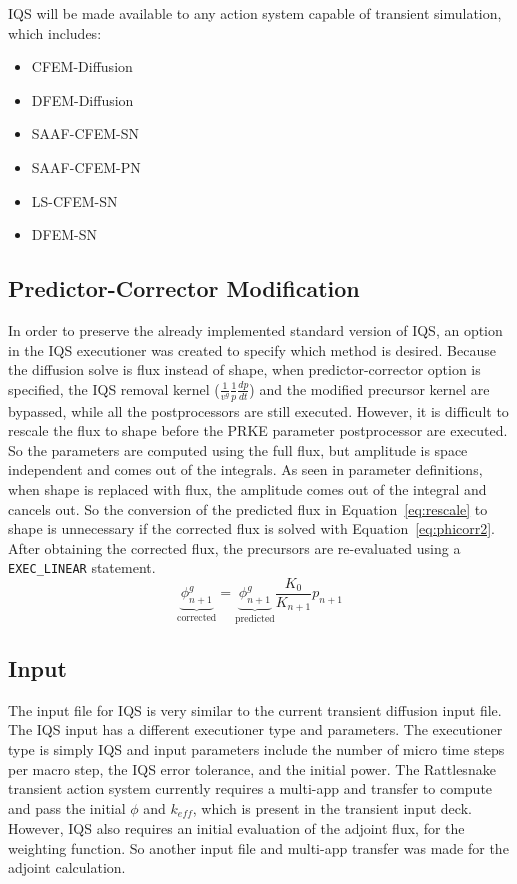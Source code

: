 \documentclass[12pt]{scrartcl}
\newcommand{\rattlesnake}{Rattlesnake }
\newcommand{\eqt}[1]{Equation~\ref{#1}}                     %
\newcommand{\keff}{k_\textit{eff}}
\newcommand{\be}{\begin{equation}}
\newcommand{\ee}{\end{equation}}
\begin{document}
IQS will be made available to any action system capable of transient simulation, which includes:
\begin{itemize}
\item CFEM-Diffusion
\item DFEM-Diffusion
\item SAAF-CFEM-SN
\item SAAF-CFEM-PN
\item LS-CFEM-SN
\item DFEM-SN
\end{itemize}

\subsection{Predictor-Corrector Modification}

In order to preserve the already implemented standard version of IQS, an option in the IQS executioner was created to specify which method is desired.  Because the diffusion solve is flux instead of shape, when predictor-corrector option is specified, the IQS removal kernel ($\frac{1}{v^g}\frac{1}{p}\frac{dp}{dt}$) and the modified precursor kernel are bypassed, while all the postprocessors are still executed.  However, it is difficult to rescale the flux to shape before the PRKE parameter postprocessor are executed.  So the parameters are computed using the full flux, but amplitude is space independent and comes out of the integrals.  As seen in parameter definitions, when shape is replaced with flux, the amplitude comes out of the integral and cancels out.  So the conversion of the predicted flux in  \eqt{eq:rescale} to shape is unnecessary if the corrected flux is solved with \eqt{eq:phicorr2}.  After obtaining the corrected flux, the precursors are re-evaluated using a \texttt{EXEC\_LINEAR} statement.
\be
\underbrace{\phi^g_{n+1}}_{\text{corrected}} = \underbrace{\phi^g_{n+1}}_{\text{predicted}} \frac{K_0}{K_{n+1}} p_{n+1}
\label{eq:phicorr2}
\ee

\subsection{Input}

The input file for IQS is very similar to the current transient diffusion input file.  The IQS input has a different executioner type and parameters.  The executioner type is simply IQS and input parameters include the number of micro time steps per macro step, the IQS error tolerance, and the initial power.  The \rattlesnake transient action system currently requires a multi-app and transfer to compute and pass the initial $\phi$ and $\keff$, which is present in the transient input deck.  However, IQS also requires an initial evaluation of the adjoint flux, for the weighting function.  So another input file and multi-app transfer was made for the adjoint calculation.  \\
\end{document}
